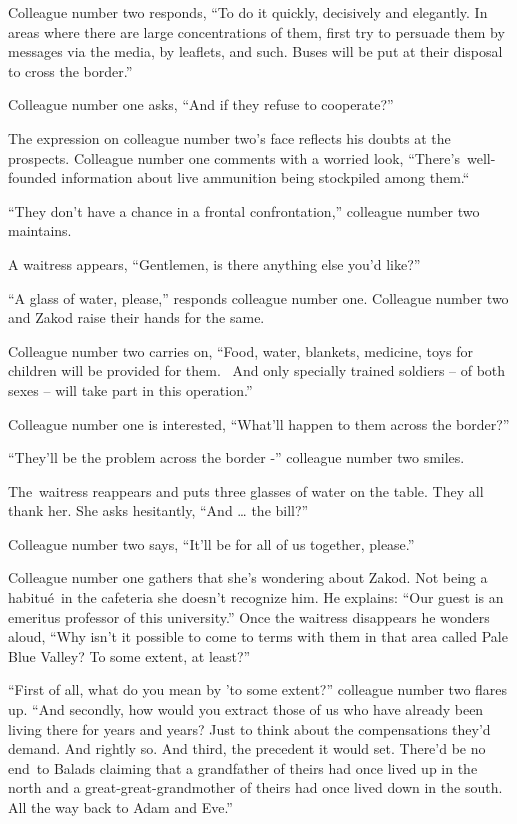 \documentclass[twoside,11pt]{book}
\begin{document}
Colleague number two responds, ``To do it quickly, decisively and elegantly. In areas where there are large
concentrations of them, first try to persuade them by messages via the media, by leaflets, and such. Buses will be put
at their disposal to cross the border.'' 

Colleague number one asks, ``And if they refuse to cooperate?'' 

The expression on colleague number two's face reflects his doubts at the prospects. Colleague number one comments with a
worried look, ``There's\ well-founded information about live ammunition being stockpiled among
them.``~ 

``They don't have a chance in a frontal confrontation,'' colleague number two maintains.

A waitress appears, ``Gentlemen, is there anything else you'd like?'' 

``A glass of water, please,'' responds colleague number one. Colleague number two and Zakod
raise their hands for the same. 

Colleague number two carries on, ``Food, water, blankets, medicine, toys for children will be provided for
them. ~And only specially trained soldiers -- of both sexes -- will take part in this operation.'' 

Colleague number one is interested, ``What{}'ll happen to them across the border?'' 

``They'll be the problem across the border -'' colleague number two smiles.

The~waitress reappears and puts three glasses of water on the table. They all thank her. She asks hesitantly,
``And {\dots} the bill?'' 

Colleague number two says, ``It'll be for all of us together, please.'' 

Colleague number one gathers that she's wondering about Zakod. Not being a habitu\'e\ in the cafeteria she doesn't
recognize him. He explains: ``Our guest is an emeritus professor of this university.'' Once
the waitress disappears he wonders aloud, ``Why isn't it possible to come to terms with them in that area
called Pale Blue Valley? To some extent, at least?'' \ 

``First of all, what do you mean by 'to some extent?'' colleague number two flares up.
``And secondly, how would you extract those of us who have already been living there for years and years?
Just to think about the compensations they'd demand. And rightly so. And third, the precedent it would set. There'd be
no end\ to Balads claiming that a grandfather of theirs had once lived up in the north and a great-great-grandmother of
theirs had once lived down in the south. All the way back to Adam and Eve.'' 
\end{document}
